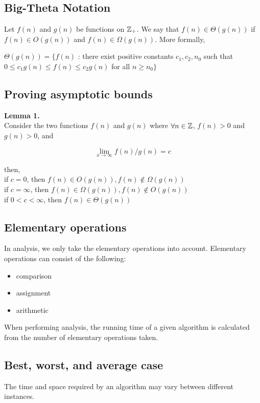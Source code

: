 \documentclass[a4paper]{article}
\begin{document}
\subsection{Big-Theta Notation}
Let $f(n)$ and $g(n)$ be functions on $\mathbb{Z}_{+}$. We say that $f(n) \in \Theta(g(n))$ if $f(n) \in O(g(n))$ and $f(n) \in \Omega(g(n))$. More formally,

\begin{center} $\Theta(g(n)) = \{f(n)$ : there exist positive constants $c_1, c_2, n_0$ such that\\ $0 \le c_1g(n) \le f(n) \le c_2g(n)$ for all $n \ge n_0\}$ \end{center}

\subsection{Proving asymptotic bounds}
\textbf{Lemma 1.}\\
Consider the two functions $f(n)$ and $g(n)$ where $\forall n \in \mathbb{Z}$, $f(n) > 0$ and $g(n) > 0$, and
\begin{center} $$\lim_{x\to\infty}f(n)/g(n) = c$$ \end{center}
then,\\
if $c=0$, then $f(n)\in O(g(n)), f(n) \notin \Omega(g(n))$\\
if $c=\infty$, then $f(n)\in \Omega(g(n)), f(n) \notin O(g(n))$\\
if $0<c<\infty$, then $f(n)\in \Theta(g(n))$

\subsection{Elementary operations}
In analysis, we only take the elementary operations into account. Elementary operations can consist of the following:
\begin{itemize}
	\itemsep0em
	\item comparison
	\item assignment
	\item arithmetic
\end{itemize}
When performing analysis, the running time of a given algorithm is calculated from the number of elementary operations taken.

\subsection{Best, worst, and average case}
The time and space required by an algorithm may vary between different instances.
\end{document}
